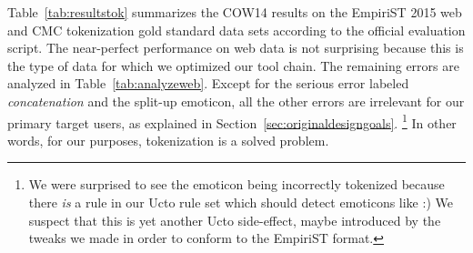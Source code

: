 \documentclass[11pt]{article}
\begin{document}
Table~\ref{tab:resultstok} summarizes the COW14 results on the EmpiriST 2015 web and CMC tokenization gold standard data sets according to the official evaluation script.
The near-perfect performance on web data is not surprising because this is the type of data for which we optimized our tool chain.
The remaining errors are analyzed in Table~\ref{tab:analyzeweb}.
Except for the serious error labeled \textit{concatenation} and the split-up emoticon, all the other errors are irrelevant for our primary target users, as explained in Section~\ref{sec:originaldesigngoals}.%
\footnote{We were surprised to see the emoticon being incorrectly tokenized because there \textit{is} a rule in our Ucto rule set which should detect emoticons like :)
We suspect that this is yet another Ucto side-effect, maybe introduced by the tweaks we made in order to conform to the EmpiriST format.}
In other words, for our purposes, tokenization is a solved problem.

\begin{table*}[!htb]
  \centering
  \caption{Breakdown of tokenizer errors by types for the web data}
  \label{tab:analyzeweb}
\end{table*}
\end{document}
